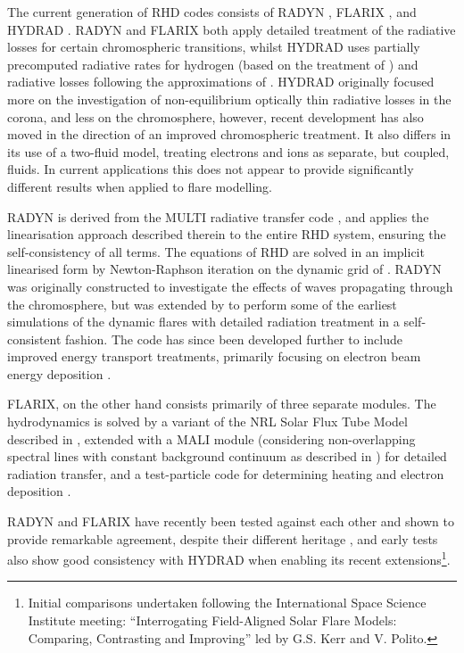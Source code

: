 The current generation of RHD codes consists of RADYN \citep{Carlsson1992a,Carlsson1995,Carlsson1999, Allred2015}, FLARIX \citep{Varady2010,Heinzel2015}, and HYDRAD \citep{Bradshaw2003, Bradshaw2013}. RADYN and FLARIX both apply detailed treatment of the radiative losses for certain chromospheric transitions, whilst HYDRAD uses partially precomputed radiative rates for hydrogen (based on the treatment of \citet{Sollum1999}) and radiative losses following the approximations of \citet{Carlsson2012}.
HYDRAD originally focused more on the investigation of non-equilibrium optically thin radiative losses in the corona, and less on the chromosphere, however, recent development has also moved in the direction of an improved chromospheric treatment.
It also differs in its use of a two-fluid model, treating electrons and ions as separate, but coupled, fluids.
In current applications this does not appear to provide significantly different results when applied to flare modelling.

RADYN is derived from the MULTI radiative transfer code \citep{Scharmer1985, Carlsson1986, Carlsson1992}, and applies the linearisation approach described therein to the entire RHD system, ensuring the self-consistency of all terms. The equations of RHD are solved in an implicit linearised form by Newton-Raphson iteration on the dynamic grid of \citet{Dorfi1987}.
RADYN was originally constructed to investigate the effects of waves propagating through the chromosphere, but was extended by \citet{Abbett1999} to perform some of the earliest simulations of the dynamic flares with detailed radiation treatment in a self-consistent fashion. The code has since been developed further to include improved energy transport treatments, primarily focusing on electron beam energy deposition \citep{Allred2005, Allred2015}.


FLARIX, on the other hand consists primarily of three separate modules. The hydrodynamics is solved by a variant of the NRL Solar Flux Tube Model described in \citet{Mariska1982,Mariska1989}, extended with a MALI module (considering non-overlapping spectral lines with constant background continuum as described in \citet{Rybicki1991}) for detailed radiation transfer, and a test-particle code for determining heating and electron deposition \citep{Varady2010, Heinzel2015}.

RADYN and FLARIX have recently been tested against each other and shown to provide remarkable agreement, despite their different heritage \citep{Kasparova2019}, and early tests also show good consistency with HYDRAD when enabling its recent extensions\footnote{Initial comparisons undertaken following the International Space Science Institute meeting: ``Interrogating Field-Aligned Solar Flare Models: Comparing, Contrasting and Improving'' led by G.S. Kerr and V. Polito.}.

